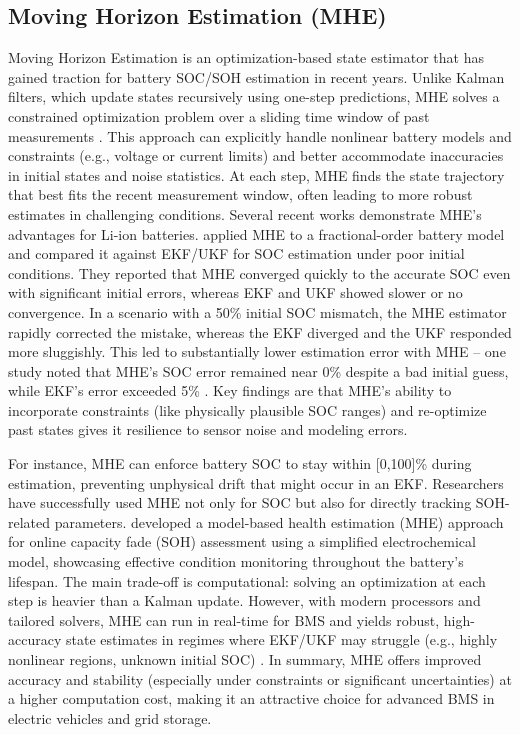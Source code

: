 \subsection{Moving Horizon Estimation (MHE)}
Moving Horizon Estimation is an optimization-based state estimator that has gained traction for battery SOC/SOH estimation in recent years. Unlike Kalman filters, which update states recursively using one-step predictions, MHE solves a constrained optimization problem over a sliding time window of past measurements \cite{10483287}. This approach can explicitly handle nonlinear battery models and constraints (e.g., voltage or current limits) and better accommodate inaccuracies in initial states and noise statistics. At each step, MHE finds the state trajectory that best fits the recent measurement window, often leading to more robust estimates in challenging conditions. Several recent works demonstrate MHE’s advantages for Li-ion batteries. \cite{10483287} applied MHE to a fractional-order battery model and compared it against EKF/UKF for SOC estimation under poor initial conditions. They reported that MHE converged quickly to the accurate SOC even with significant initial errors, whereas EKF and UKF showed slower or no convergence. In a scenario with a 50\% initial SOC mismatch, the MHE estimator rapidly corrected the mistake, whereas the EKF diverged and the UKF responded more sluggishly. This led to substantially lower estimation error with MHE – one study noted that MHE’s SOC error remained near 0\% despite a bad initial guess, while EKF’s error exceeded 5\% \cite{10483287}. Key findings are that MHE’s ability to incorporate constraints (like physically plausible SOC ranges) and re-optimize past states gives it resilience to sensor noise and modeling errors. 

For instance, MHE can enforce battery SOC to stay within [0,100]\% during estimation, preventing unphysical drift that might occur in an EKF. Researchers have successfully used MHE not only for SOC but also for directly tracking SOH-related parameters. \cite{GUO2024113850} developed a model-based health estimation (MHE) approach for online capacity fade (SOH) assessment using a simplified electrochemical model, showcasing effective condition monitoring throughout the battery's lifespan. The main trade-off is computational: solving an optimization at each step is heavier than a Kalman update. However, with modern processors and tailored solvers, MHE can run in real-time for BMS and yields robust, high-accuracy state estimates in regimes where EKF/UKF may struggle (e.g., highly nonlinear regions, unknown initial SOC) \cite{10483287}. In summary, MHE offers improved accuracy and stability (especially under constraints or significant uncertainties) at a higher computation cost, making it an attractive choice for advanced BMS in electric vehicles and grid storage.

